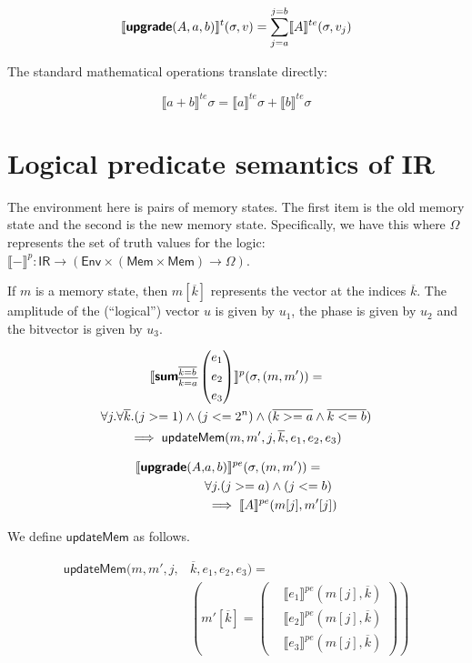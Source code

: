\documentclass[runningheads]{llncs}
\newcommand {\ra} {\rightarrow}
\newcommand {\Env} {\textsf{Env}}
\newcommand {\sem} [1] {\llbracket #1 \rrbracket}
\newcommand {\Psem} [1] {\sem{#1}^p}
\newcommand {\PsemE} [1] {\sem{#1}^{pe}}
\newcommand {\Tsem} [1] {\sem{#1}^t}
\newcommand {\TsemE} [1] {\sem{#1}^{te}}
\newcommand {\Mem} {\textsf{Mem}}
\newcommand {\ir} [1] {\textsf{\textbf{#1}}}
\newcommand {\IRep} {\textsf{IR}}
\newcommand {\irUpgrade} {\ir{upgrade}}
\newcommand {\irSum} {\ir{sum}}
\newcommand {\updateMem} {\textsf{updateMem}}
\newcommand {\truthVals} {\Omega}
\begin{document}
\[
  \Tsem{\irUpgrade(A, a, b)}(\sigma, v) =
    \sum_{j=a}^{j=b} \TsemE{A}(\sigma, v_j)
\]

\noindent
The standard mathematical operations translate directly:

\[
  \TsemE{a + b}\sigma = \TsemE{a}\sigma + \TsemE{b}\sigma
\]

\section{Logical predicate semantics of IR}

The environment here is pairs of memory states. The first item is the old memory state and the second is the new memory state. Specifically, we have this where $\truthVals$ represents the set of truth values for the logic: $\Psem{-} : \IRep \ra (\Env \times (\Mem \times \Mem) \ra \truthVals)$.

If $m$ is a memory state, then $m[\overline{k}]$ represents the vector at the indices $\overline{k}$. The amplitude of the (``logical'') vector $u$ is given by $u_1$, the phase is given by $u_2$ and the bitvector is given by $u_3$.

\begin{multline*}
  \Psem{\irSum_{\overline{k=a}}^{\overline{k=b}}
    \left(\begin{aligned}
      &e_1\\
      &e_2\\
      &e_3
    \end{aligned}\right)}(\sigma, (m, m')) =\\
    \forall j. \forall \overline{k}. (j >= 1) \land (j <= 2^n) \land (\overline{k >= a} \land \overline{k <= b})\\
    \implies \updateMem(m, m', j, \overline{k}, e_1, e_2, e_3)
\end{multline*}

\[
\begin{aligned}
  \PsemE{\irUpgrade(A, &a, b)}(\sigma, (m, m')) =\\
    &\forall j. (j >= a) \land (j <= b)\\
      &\implies \PsemE{A}(m[j], m'[j])
\end{aligned}
\]

We define $\updateMem$ as follows.

\[
\begin{aligned}
  \updateMem(m, m', j, &\overline{k}, e_1, e_2, e_3) =\\
    &\left(m'[\overline{k}] = \left(\begin{aligned}
                          &\PsemE{e_1}(m[j], \overline{k})\\
                          &\PsemE{e_2}(m[j], \overline{k})\\
                          &\PsemE{e_3}(m[j], \overline{k})
    \end{aligned}\right)\right)
\end{aligned}
\]
\end{document}
